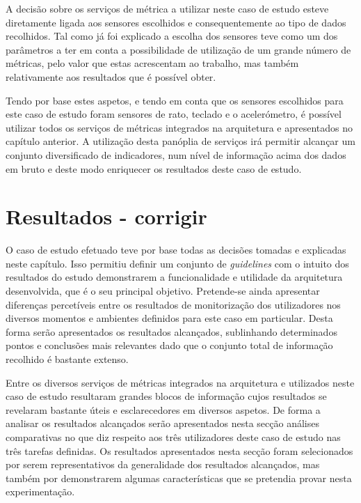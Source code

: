 A decisão sobre os serviços de métrica a utilizar neste caso de estudo esteve diretamente ligada aos sensores escolhidos e consequentemente ao tipo de dados recolhidos. Tal como já foi explicado a escolha dos sensores teve como um dos parâmetros a ter em conta a possibilidade de utilização de um grande número de métricas, pelo valor que estas acrescentam ao trabalho, mas também relativamente aos resultados que é possível obter.

Tendo por base estes aspetos, e tendo em conta que os sensores escolhidos para este caso de estudo foram sensores de rato, teclado e o acelerómetro, é possível utilizar todos os serviços de métricas integrados na arquitetura e apresentados no capítulo anterior. A utilização desta panóplia de serviços irá permitir alcançar um conjunto diversificado de indicadores, num nível de informação acima dos dados em bruto e deste modo enriquecer os resultados deste caso de estudo.

\section{Resultados - corrigir}

O caso de estudo efetuado teve por base todas as decisões tomadas e explicadas neste capítulo. Isso permitiu definir um conjunto de \textit{guidelines} com o intuito dos resultados do estudo demonstrarem a funcionalidade e utilidade da arquitetura desenvolvida, que é o seu principal objetivo. Pretende-se ainda apresentar diferenças percetíveis entre os resultados de monitorização dos utilizadores nos diversos momentos e ambientes definidos para este caso em particular. Desta forma serão apresentados os resultados alcançados, sublinhando determinados pontos e conclusões mais relevantes dado que o conjunto total de informação recolhido é bastante extenso.

Entre os diversos serviços de métricas integrados na arquitetura e utilizados neste caso de estudo resultaram grandes blocos de informação cujos resultados se revelaram bastante úteis e esclarecedores em diversos aspetos. De forma a analisar os resultados alcançados serão apresentados nesta secção análises comparativas no que diz respeito aos três utilizadores deste caso de estudo nas três tarefas definidas. Os resultados apresentados nesta secção foram selecionados por serem representativos da generalidade dos resultados alcançados, mas também por demonstrarem algumas características que se pretendia provar nesta experimentação.

